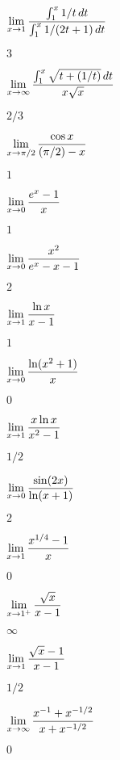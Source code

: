 \begin{exercises}
\exercise $\displaystyle\lim_{x\to1}{\int_1^x 1/t\,dt\over\int_1^x 1/(2t+1)\,dt}$
\begin{answer} $3$
\end{answer}

\exercise $\displaystyle\lim_{x\to\infty}{\int_1^x\sqrt{t+(1/t)}\,dt\over x\sqrt{x}}$
\begin{answer} $2/3$
\end{answer}

\exercise $\displaystyle\lim_{x\to\pi/2}{\cos x\over (\pi/2)-x}$
\begin{answer} $1$
\end{answer}

\exercise $\displaystyle\lim_{x\to0}{e^x-1\over x}$
\begin{answer} $1$
\end{answer}

\exercise $\displaystyle\lim_{x\to0}{x^2\over e^x-x-1}$
\begin{answer} $2$
\end{answer}

\exercise $\displaystyle\lim_{x\to1}{\ln x\over x-1}$
\begin{answer} $1$
\end{answer}

\exercise $\displaystyle\lim_{x\to0}{\ln(x^2+1)\over x}$
\begin{answer} $0$
\end{answer}

\exercise $\displaystyle\lim_{x\to1}{x\ln x\over x^2-1}$
\begin{answer} $1/2$
\end{answer}

\exercise $\displaystyle\lim_{x\to0}{\sin(2x)\over\ln(x+1)}$
\begin{answer} $2$
\end{answer}

\exercise $\displaystyle\lim_{x\to1}{x^{1/4}-1\over x}$
\begin{answer} $0$
\end{answer}

\exercise $\displaystyle\lim_{x\to1^+}{\sqrt{x}\over x-1}$
\begin{answer} $\infty$
\end{answer}

\exercise $\displaystyle\lim_{x\to1}{\sqrt{x}-1\over x-1}$
\begin{answer} $1/2$
\end{answer}

\exercise $\displaystyle\lim_{x\to\infty}{x^{-1}+x^{-1/2}\over x+x^{-1/2}}$
\begin{answer} $0$
\end{answer}


\end{exercises}
